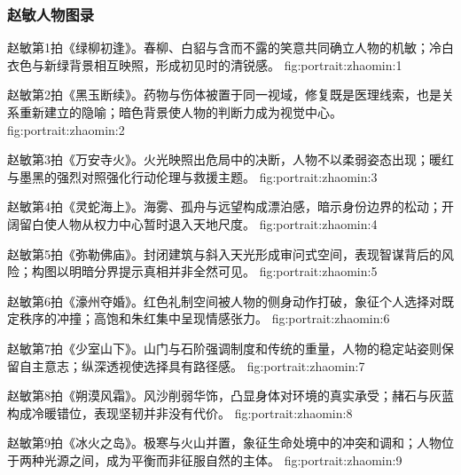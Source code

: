 
\clearpage
\subsubsection{赵敏人物图录}

  {赵敏第1拍《绿柳初逢》。春柳、白貂与含而不露的笑意共同确立人物的机敏；冷白衣色与新绿背景相互映照，形成初见时的清锐感。}
  {fig:portrait:zhaomin:1}

  {赵敏第2拍《黑玉断续》。药物与伤体被置于同一视域，修复既是医理线索，也是关系重新建立的隐喻；暗色背景使人物的判断力成为视觉中心。}
  {fig:portrait:zhaomin:2}

  {赵敏第3拍《万安寺火》。火光映照出危局中的决断，人物不以柔弱姿态出现；暖红与墨黑的强烈对照强化行动伦理与救援主题。}
  {fig:portrait:zhaomin:3}

\clearpage

  {赵敏第4拍《灵蛇海上》。海雾、孤舟与远望构成漂泊感，暗示身份边界的松动；开阔留白使人物从权力中心暂时退入天地尺度。}
  {fig:portrait:zhaomin:4}

  {赵敏第5拍《弥勒佛庙》。封闭建筑与斜入天光形成审问式空间，表现智谋背后的风险；构图以明暗分界提示真相并非全然可见。}
  {fig:portrait:zhaomin:5}

  {赵敏第6拍《濠州夺婚》。红色礼制空间被人物的侧身动作打破，象征个人选择对既定秩序的冲撞；高饱和朱红集中呈现情感张力。}
  {fig:portrait:zhaomin:6}

\clearpage

  {赵敏第7拍《少室山下》。山门与石阶强调制度和传统的重量，人物的稳定站姿则保留自主意志；纵深透视使选择具有路径感。}
  {fig:portrait:zhaomin:7}

  {赵敏第8拍《朔漠风霜》。风沙削弱华饰，凸显身体对环境的真实承受；赭石与灰蓝构成冷暖错位，表现坚韧并非没有代价。}
  {fig:portrait:zhaomin:8}

  {赵敏第9拍《冰火之岛》。极寒与火山并置，象征生命处境中的冲突和调和；人物位于两种光源之间，成为平衡而非征服自然的主体。}
  {fig:portrait:zhaomin:9}

